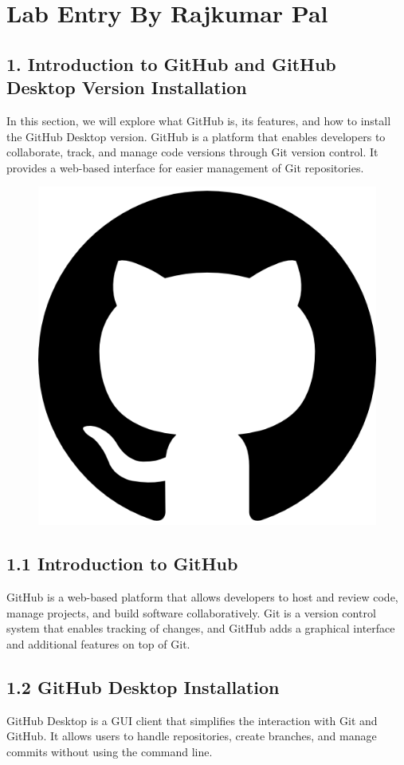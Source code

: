 \documentclass[a4paper,12pt]{article}
\begin{document}
\newpage

\section*{Lab Entry By Rajkumar Pal}

\subsection*{1. Introduction to GitHub and GitHub Desktop Version Installation}


In this section, we will explore what GitHub is, its features, and how to install the GitHub Desktop version. 
GitHub is a platform that enables developers to collaborate, track, and manage code versions through Git version control. 
It provides a web-based interface for easier management of Git repositories. 
\vspace{0.1 cm}
\begin{figure}[h!]
   \centering
    \includegraphics[width=0.5\linewidth]{25231.png}
\end{figure}
\vspace{0.5 cm}

\subsection*{1.1 Introduction to GitHub}
GitHub is a web-based platform that allows developers to host and review code, manage projects, and build software collaboratively. 
Git is a version control system that enables tracking of changes, and GitHub adds a graphical interface and additional features on top of Git.

\subsection*{1.2 GitHub Desktop Installation}
GitHub Desktop is a GUI client that simplifies the interaction with Git and GitHub. 
It allows users to handle repositories, create branches, and manage commits without using the command line.
\\
\\
\end{document}
